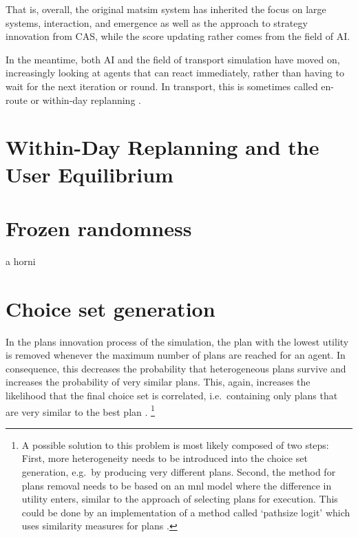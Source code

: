 That is, overall, the original \acrshort{matsim} system has inherited the focus on large systems, interaction, and emergence as well as the approach to strategy innovation from CAS, while the score updating rather comes from the field of AI.

In the meantime, both AI and the field of transport simulation have moved on, increasingly looking at agents that can react immediately, rather than having to wait for the next iteration or round.  In transport, this is sometimes called en-route or within-day replanning \citep[e.g.][]{EmmerinkEtAl_TransResC_1995,balijepalli-2007}.




\section{Within-Day Replanning and the User Equilibrium}
\label{sec:researchavenues-withinday}

\vfill\eject
\section{Frozen randomness}

a horni

\vfill\eject
\section{Choice set generation}
\label{sec:choicesets}


In the plans innovation process of the simulation, the plan with the lowest utility is removed whenever the maximum number of plans are reached for an agent. In consequence, this decreases the probability that heterogeneous plans survive and increases the probability of very similar plans. This, again, increases the likelihood that the final choice set is correlated, i.e.\ containing only plans that are very similar to the best plan \citep[see][for a review on correlation of 
 routes]{Prato2009ChoiceModellingSurvey}.%
 \footnote{
 A possible solution to this problem is most likely composed of two steps:
 First, more heterogeneity needs to be introduced into the choice set generation, e.g.\ by producing very different plans.
 Second, the method for plans removal needs to be based on an \gls{mnl} model where the difference in utility enters, similar to the approach of selecting plans for execution. This could be done by an implementation of a method called `pathsize logit' which uses similarity measures for plans \citep[see][for a possible solution in route choice]{FrejingerBierlaire2007PathSizeLogit, BenAkivaBierlaiere1999DiscreteChoice}.
 }

